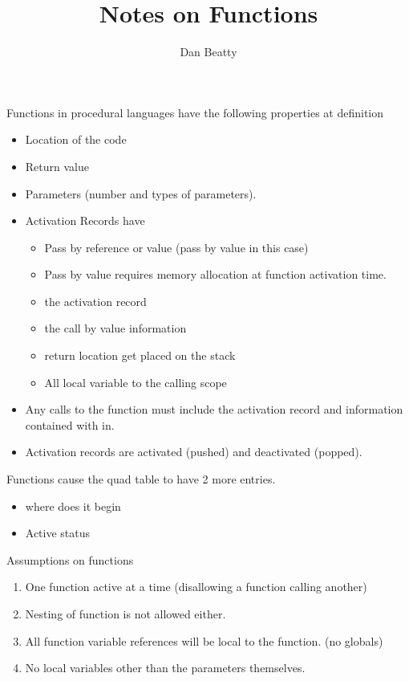 \documentclass[11pt]{article}
\title{Notes on Functions}
\author{Dan Beatty}
\begin{document}
\maketitle



Functions in procedural languages have the following properties at definition
\begin{itemize}
\item Location of the code
\item Return value
\item Parameters (number and types of parameters).
\item Activation Records have
\begin{itemize}
\item Pass by reference or value (pass by value in this case)
\item Pass by value requires memory allocation at function activation time. 
\item the activation record
\item the call by value information 
\item  return location get placed on the stack
\item All local variable to the calling scope
\end{itemize}
\item Any calls to the function must include the activation record and information contained with in. 
\item Activation records are activated (pushed) and deactivated (popped).   
\end{itemize}

Functions cause the quad table to have 2 more entries.  
\begin{itemize}
\item where does it begin
\item Active status 
\end{itemize}

\newpage
Assumptions on functions
\begin{enumerate}
\item One function active at a time (disallowing a function calling another)
\item Nesting of function is not allowed either. 
\item All function variable references will be local to the function.  (no globals)
\item No local variables other than the parameters themselves.  
\end{enumerate}
\end{document}

